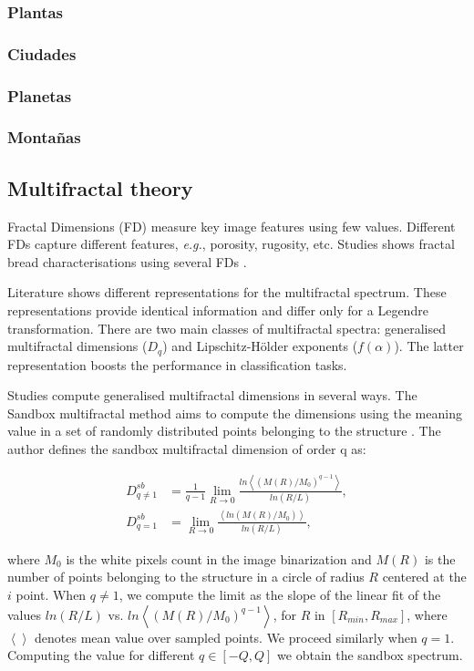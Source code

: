 \documentclass[spanish,a4paper,11pt,oneside,links]{report}
\begin{document}
\subsubsection{Plantas}
\subsubsection{Ciudades}
\subsubsection{Planetas}
\subsubsection{Montañas}


\subsection{Multifractal theory}

Fractal Dimensions (FD) measure key image features using few values. Different FDs capture different features, {\em e.g.}, porosity, rugosity, etc. Studies shows fractal bread characterisations using several FDs \cite{Gonzales2008,Baravalle2012}. 

Literature shows different representations for the multifractal spectrum. These representations provide identical information and differ only for a Legendre transformation. There are two main classes of multifractal spectra: generalised multifractal dimensions ($D_{q}$) and Lipschitz-H\"older exponents ($f(\alpha)$). The latter representation boosts the performance in classification tasks.

Studies compute generalised multifractal dimensions in several ways. The Sandbox multifractal method \cite{Tel1989} aims to compute the dimensions using the meaning value in a set of randomly distributed points belonging to the structure \cite{Debartolo2004}. The author defines the sandbox multifractal dimension of order q as:

 \begin{align}
D_{q\ne 1}^{sb} &= \frac{1}{q-1} \lim_{R \rightarrow 0}{
\frac{ln   { \left\langle  (M(R)/M_{0})^{q-1} \right\rangle   }}
{ln {(R/L)}       }},\\
D_{q=1}^{sb} &= \lim_{R \rightarrow 0}{
\frac{ \left\langle ln   { (M(R)/M_{0})  }  \right\rangle}
{ln {(R/L)}       }},
\end{align}

\noindent where $M_{0}$ is the white pixels count in the image binarization and  $M(R)$ is the number of points belonging to the structure in a circle of radius $R$ centered at the $i$ point. When $q\ne1$, we compute the limit as the slope of the linear fit of the values $ln(R/L)$ vs. $ ln  \left\langle  { (M(R)/M_{0})^{q-1}  }  \right\rangle$, for $R$ in $[R_{min}, R_{max}]$, where $ \left\langle   \right\rangle$ denotes mean value over sampled points. We proceed similarly when $q=1$. Computing the value for different $q \in [-Q,Q]$  we obtain the sandbox spectrum.
\end{document}
